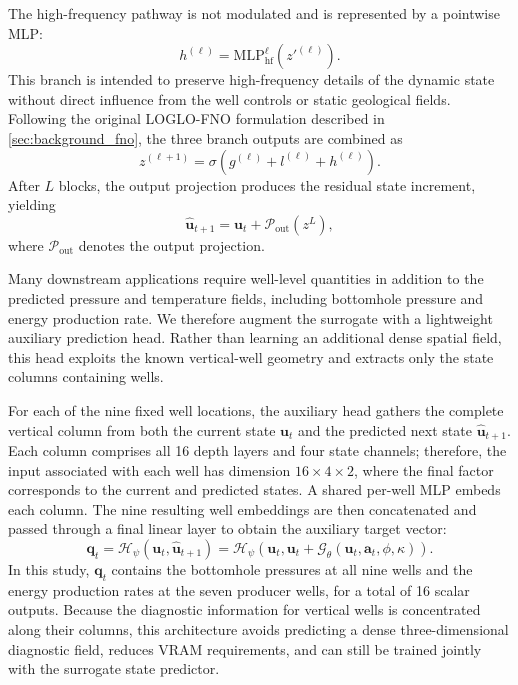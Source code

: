 \documentclass[pdflatex,sn-mathphys-ay]{sn-jnl}
\newcommand{\svec}{\mathbf{u}}            %
\newcommand{\action}{\mathbf{a}}           %
\newcommand{\model}{\mathcal{G}_\theta}    %
\begin{document}
The high-frequency pathway is not modulated and is represented by a pointwise
MLP:
\begin{equation}
  h^{(\ell)}
  =
  \mathrm{MLP}_{\mathrm{hf}}^\ell(z'^{(\ell)}).
\end{equation}
This branch is intended to preserve high-frequency details of the dynamic state
without direct influence from the well controls or static geological fields.
Following the original LOGLO-FNO formulation described in
\cref{sec:background_fno}, the three branch outputs are combined as
\begin{equation}
  z^{(\ell+1)}
  =
  \sigma\!\left(
    g^{(\ell)}+l^{(\ell)}+h^{(\ell)}
  \right).
\end{equation}
After \(L\) blocks, the
output projection produces the residual state increment, yielding
\begin{equation}
  \hat{\svec}_{t+1}
  =
  \svec_t+\mathcal{P}_{\mathrm{out}}(z^L),
\end{equation}
where \(\mathcal{P}_{\mathrm{out}}\) denotes the output projection.

Many downstream applications require well-level quantities in addition to the
predicted pressure and temperature fields, including bottomhole pressure and
energy production rate. We therefore augment the surrogate with a lightweight
auxiliary prediction head. Rather than learning an additional dense spatial
field, this head exploits the known vertical-well geometry and extracts only the
state columns containing wells.

For each of the nine fixed well locations, the auxiliary head gathers the
complete vertical column from both the current state \(\svec_t\) and the
predicted next state \(\hat{\svec}_{t+1}\). Each column comprises all 16 depth
layers and four state channels; therefore, the input associated with each well
has dimension \(16\times4\times2\), where the final factor corresponds to the
current and predicted states. A shared per-well MLP embeds each column. The nine
resulting well embeddings are then concatenated and passed through a final
linear layer to obtain the auxiliary target vector:
\begin{equation}
  \mathbf{q}_t
  =
  \mathcal{H}_\psi(\svec_t,\hat{\svec}_{t+1})
  =
  \mathcal{H}_\psi\!\left(
    \svec_t,
    \svec_t+\model(\svec_t,\action_t,\phi,\kappa)
  \right).
  \label{eq:aux}
\end{equation}
In this study, \(\mathbf{q}_t\) contains the bottomhole pressures at all nine
wells and the energy production rates at the seven producer wells, for a total
of 16 scalar outputs. Because the diagnostic information for vertical wells is
concentrated along their columns, this architecture avoids predicting a dense
three-dimensional diagnostic field, reduces VRAM requirements, and can still
be trained jointly with the surrogate state predictor.
\end{document}
